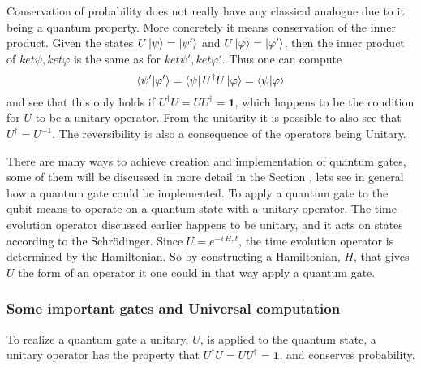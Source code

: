 Conservation of probability does not really have any classical analogue due to it being a quantum property. More concretely it means conservation of the inner product. Given the states $U\ket{\psi} = \ket{\psi'}$ and $U\ket{\varphi} = \ket{\varphi'}$, then the inner product of $ket{\psi},ket{\varphi}$ is the same as for $ket{\psi'},ket{\varphi'}$. Thus one can compute
\begin{equation}
\bra{\psi'}\ket{\varphi'} = \bra{\psi}U^\dagger U\ket{\varphi} = \bra{\psi}\ket{\varphi}
\end{equation}
and see that this only holds if $U^\dagger U = UU^\dagger = \mathbf{1}$, which happens to be the condition for $U$ to be a unitary operator. From the unitarity it is possible to also see that $U^\dagger = U^{-1}$. The reversibility is also a consequence of the operators being Unitary.

There are many ways to achieve creation and implementation of quantum gates, some of them will be discussed in more detail in the Section , lets see in general how a quantum gate could be implemented. To apply a quantum gate to the qubit means to operate on a quantum state with a unitary operator. The time evolution operator discussed earlier happens to be unitary, and it acts on states according to the Schrödinger. Since $U = e^{-i\,H,t}$, the time evolution operator is determined by the Hamiltonian. So by constructing a Hamiltonian, $H$, that gives $U$ the form of an operator it one could in that way apply a quantum gate.


\subsubsection{Some important gates and Universal computation}
To realize a quantum gate a unitary, $U$, is applied to the quantum state, a unitary operator has the property that $U^\dagger U = UU^\dagger = \mathbf{1}$, and conserves probability. 

